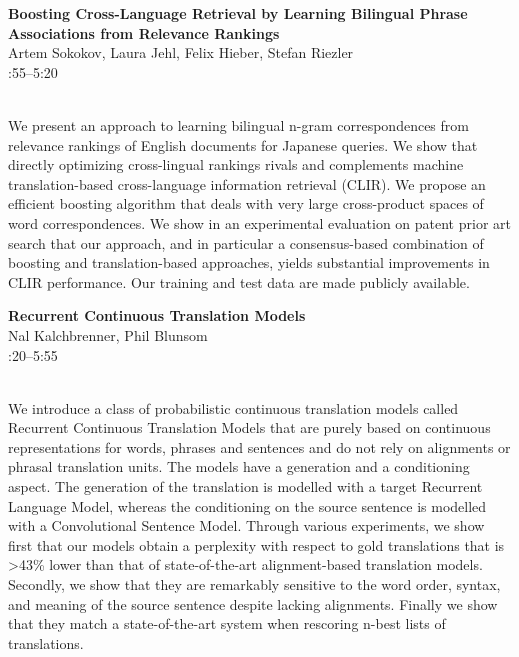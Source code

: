 \documentclass[twoside,makeidx]{book}
\renewcommand{\normalsize}{\fontsize{8}{9}\selectfont}
\renewcommand{\small}{\fontsize{7}{8}\selectfont}
\begin{document}
\par\vspace{2em}\noindent%
\begin{minipage}{\linewidth}%
\begin{center}
\textbf{\normalsize Boosting Cross-Language Retrieval by Learning Bilingual Phrase Associations from Relevance Rankings}\\
\normalsize  Artem Sokokov,  Laura Jehl,  Felix Hieber,  Stefan Riezler\\
{\small 4:55--5:20}\\
\end{center}
\end{minipage}\\[0.5em]
\nopagebreak%
\noindent%
{\small We present an approach to learning bilingual n-gram correspondences from relevance rankings of English documents for Japanese queries. We show that directly optimizing cross-lingual rankings rivals and complements machine translation-based cross-language information retrieval (CLIR). We propose an efficient boosting algorithm that deals with very large cross-product spaces of word correspondences. We show in an experimental evaluation on patent prior art search that our approach, and in particular a consensus-based combination of boosting and translation-based approaches, yields substantial improvements in CLIR performance. Our training and test data are made publicly available.}
\par\vspace{2em}\noindent%
\begin{minipage}{\linewidth}%
\begin{center}
\textbf{\normalsize Recurrent Continuous Translation Models}\\
\normalsize  Nal Kalchbrenner,  Phil Blunsom\\
{\small 5:20--5:55}\\
\end{center}
\end{minipage}\\[0.5em]
\nopagebreak%
\noindent%
{\small We introduce a class of probabilistic continuous translation models called Recurrent Continuous Translation Models that are purely based on continuous representations for words, phrases and sentences and do not rely on alignments or phrasal translation units. The models have a generation and a conditioning aspect. The generation of the translation is modelled with a target Recurrent Language Model, whereas the conditioning on the source sentence is modelled with a Convolutional Sentence Model.  Through various experiments, we show first that our models obtain a perplexity with respect to gold translations that is >43\% lower than that of state-of-the-art alignment-based translation models. Secondly, we show that they are remarkably sensitive to the word order, syntax, and meaning of the source sentence despite lacking alignments.  Finally we show that they match a state-of-the-art system when rescoring n-best lists of translations.}
\clearpage
\end{document}
